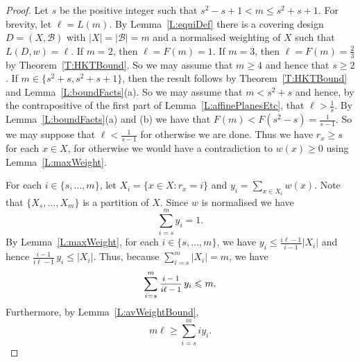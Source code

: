 \documentclass[11pt]{article}
\theoremstyle{definition}
\renewcommand{\leq}{\leqslant}
\renewcommand{\geq}{\geqslant}
\newcommand{\B}{{\ensuremath{\mathcal{B}}}}
\begin{document}
\begin{proof}
Let $s$ be the positive integer such that $s^2-s+1< m \leq s^2+s+1$. For brevity, let $\ell=L(m)$. By Lemma~\ref{L:equiDef} there is a covering design $D=(X,\B)$ with $|X|=|\B|=m$ and a normalised weighting of $X$ such that $L(D,w)=\ell$. If $m = 2$, then $\ell=F(m)=1$. If $m=3$, then $\ell=F(m)=\frac{2}{3}$ by Theorem~\ref{T:HKTBound}. So we may assume that $m \geq 4$ and hence that $s \geq 2$. If $m \in \{s^2+s,s^2+s+1\}$, then the result follows by Theorem~\ref{T:HKTBound} and Lemma~\ref{L:boundFacts}(a). So we may assume that $m < s^2+s$ and hence, by the contrapositive of the first part of Lemma~\ref{L:affinePlanesEtc}, that $\ell>\frac{1}{s}$. By Lemma~\ref{L:boundFacts}(a) and (b) we have that $F(m) < F(s^2-s) =\frac{1}{s-1}$. So we may suppose that $\ell<\frac{1}{s-1}$ for otherwise we are done. Thus we have $r_x \geq s$ for each $x \in X$, for otherwise we would have a contradiction to $w(x) \geq 0$ using Lemma~\ref{L:maxWeight}.

For each $i \in \{s,\ldots,m\}$, let $X_i=\{x \in X:r_x=i\}$ and $y_i=\sum_{x \in X_i}w(x)$. Note that $\{X_s,\ldots,X_m\}$ is a partition of $X$. Since $w$ is normalised we have
\begin{equation}\label{E:unitWeight}
    \sum_{i=s}^m y_i = 1.
\end{equation}
By Lemma~\ref{L:maxWeight}, for each $i \in \{s,\ldots,m\}$, we have $y_i \leq \frac{i\ell-1}{i-1}|X_i|$ and hence $\frac{i-1}{i\ell-1}\,y_i \leq |X_i|$. Thus, because $\sum_{i=s}^m|X_i|=m$, we have
\begin{equation}\label{E:numVerts}
    \sum_{i=s}^m \mfrac{i-1}{i\ell-1}\,y_i \leq m.
\end{equation}
Furthermore, by Lemma~\ref{L:avWeightBound},
\begin{equation}\label{E:totalWeight}
    m\ell \geq \sum_{i=s}^m iy_i.
\end{equation}


\end{proof}
\end{document}
